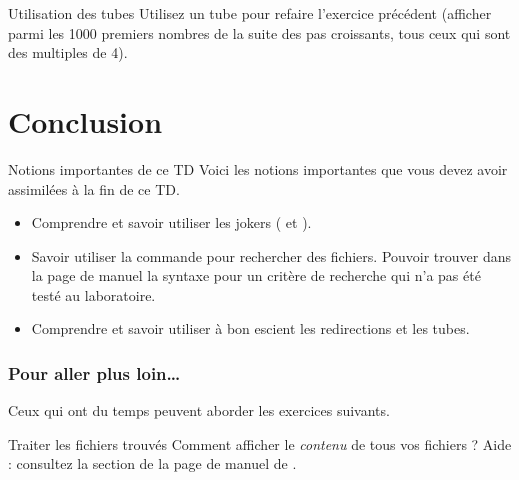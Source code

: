 \documentclass[a4paper,11pt]{style-esi/td}
\begin{document}
		\begin{Exercice}{Utilisation des tubes}
			Utilisez un tube pour refaire l'exercice précédent
			(afficher parmi les 1000 premiers nombres de la suite des pas croissants,
			tous ceux qui sont des multiples de 4).
		\end{Exercice}

\section{Conclusion}

	\begin{theorie}{Notions importantes de ce TD}
		Voici les notions importantes que vous devez avoir assimilées à la fin de ce TD.
		\begin{itemize}
		\item Comprendre et savoir utiliser les jokers (\samp{*} et ).
		\item Savoir utiliser la commande  pour rechercher des fichiers.
			Pouvoir trouver dans la page de manuel la syntaxe pour un critère de recherche
			qui n'a pas été testé au laboratoire.
		\item Comprendre et savoir utiliser à bon escient les redirections et les tubes.
		\end{itemize}
	\end{theorie}

	\subsubsection*{Pour aller plus loin\dots}
	Ceux qui ont du temps peuvent aborder les exercices suivants.

	\begin{Exercice}{Traiter les fichiers trouvés}
		Comment afficher le \emph{contenu} de tous vos fichiers  ?
		Aide : consultez la section  de la page de manuel
		de .
	\end{Exercice}
\end{document}
